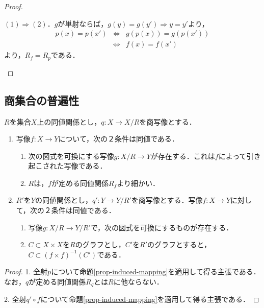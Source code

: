 \documentclass[uplatex,dvipdfmx]{jsreport}
\begin{document}
\begin{proof}
\begin{description}
        $(1)\Rightarrow(2)$．$g$が単射ならば，$g(y)=g(y')\Rightarrow y=y'$より，
        \begin{eqnarray*}
            p(x)=p(x') &\Leftrightarrow& g(p(x))=g(p(x')) \\
            &\Leftrightarrow& f(x)=f(x')
        \end{eqnarray*}
        より，$R_f=R_p$である．
    \end{description}
\end{proof}

\subsection{商集合の普遍性}

\begin{corollary}[商集合の普遍性]\label{cor-universality-of-quotient-set}
    $R$を集合$X$上の同値関係とし，$q:X\to X/R$を商写像とする．
    \begin{enumerate}
        \item 写像$f:X\to Y$について，次の２条件は同値である．
        \begin{enumerate}[(1)]
            \item 次の図式を可換にする写像$g:X/R\to Y$が存在する．これは$f$によって引き起こされた写像である．\begin{center}\end{center}
            \item $R$は，$f$が定める同値関係$R_f$より細かい．
        \end{enumerate}
        \item $R'$を$Y$の同値関係とし，$q':Y\to Y/R'$を商写像とする．写像$f:X\to Y$に対して，次の２条件は同値である．
        \begin{enumerate}[(1)]
            \item 写像$g:X/R\to Y/R'$で，次の図式を可換にするものが存在する．
            \begin{center}\end{center}
            \item $C\subset X\times X$を$R$のグラフとし，$C'$を$R'$のグラフとすると，$C\subset (f\times f)^{-1}(C')$である．
        \end{enumerate}
    \end{enumerate}
\end{corollary}
\begin{proof}
    1. 全射$p$について命題\ref{prop-induced-mapping}を適用して得る主張である．なお，$q$が定める同値関係$R_q$とは$R$に他ならない．
    
    2. 全射$q'\circ f$について命題\ref{prop-induced-mapping}を適用して得る主張である．
\end{proof}
\end{document}
